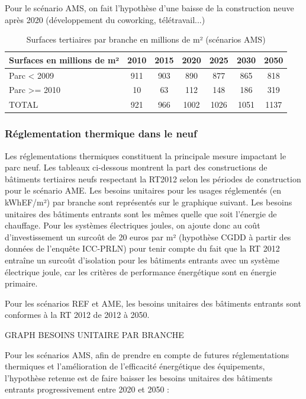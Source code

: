\documentclass[10.5pt,a4paper]{article}
\begin{document}
{Pour le scénario AMS, on fait l’hypothèse d’une baisse de la construction neuve après 2020 (développement du coworking, télétravail...) 

\begin{table}[h!]
\caption{Surfaces tertiaires par branche en millions de m² (scénarios AMS)}
\begin{center}
\begin{tabular}{|l|c|c|c|c|c|c|}
\hline
Surfaces en millions de m²	& 2010	& 2015	& 2020 & 	2025 & 	2030	& 2050 \\
\hline
Parc < 2009		& 911	& 903	& 890 	& 877		& 865			& 818 \\
Parc >= 2010	& 10	& 63	& 112		& 148		& 186			& 319 \\
TOTAL					& 921	& 966	& 1002	& 1026 	& 1051	 	& 1137 \\
\hline
\end{tabular}
\end{center}
\end{table}

\subsubsection{Réglementation thermique dans le neuf}

Les réglementations thermiques constituent la principale mesure impactant le parc neuf. Les tableaux ci-dessous montrent la part des constructions de bâtiments tertiaires neufs respectant la RT2012 selon les périodes de construction pour le scénario AME. Les besoins unitaires pour les usages réglementés (en kWhEF/m²) par branche sont représentés sur le graphique suivant. Les besoins unitaires des bâtiments entrants sont les mêmes quelle que soit l’énergie de chauffage. Pour les systèmes électriques joules, on ajoute donc au coût d’investissement un surcoût de 20 euros par m² (hypothèse CGDD à partir des données de l’enquête ICC-PRLN) pour tenir compte du fait que la RT 2012 entraîne un surcoût d’isolation pour les bâtiments entrants avec un système électrique joule, car les critères de performance énergétique sont en énergie primaire.

Pour les scénarios REF et AME, les besoins unitaires des bâtiments entrants sont conformes à la RT 2012 de 2012 à 2050.

GRAPH BESOINS UNITAIRE PAR BRANCHE

Pour les scénarios AMS, afin de prendre en compte de futures réglementations thermiques et l’amélioration de l’efficacité énergétique des équipements, l’hypothèse retenue est de faire baisser les besoins unitaires des bâtiments entrants progressivement entre 2020 et 2050 :

}
\end{document}
